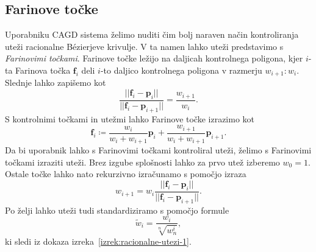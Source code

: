 \documentclass[isrm2, tisk]{fmfdelo}
\newcommand{\p}{\mathbf{p}}
\begin{document}
    \subsection{Farinove točke}
    Uporabniku CAGD sistema želimo nuditi čim bolj naraven način kontroliranja uteži racionalne Bézierjeve krivulje.
    V ta namen lahko uteži predstavimo s \textit{Farinovimi točkami}.
    Farinove točke ležijo na daljicah kontrolnega poligona, kjer $i$-ta Farinova točka $\mathbf{f}_i$ deli $i$-to daljico kontrolnega poligona v razmerju $w_{i+1}:w_{i}$.
    Slednje lahko zapišemo kot \[\frac{||\mathbf{f}_i-\p_i||}{||\mathbf{f}_i-\p_{i+1}||} = \frac{w_{i+1}}{w_{i}}.\]
    S kontrolnimi točkami in utežmi lahko Farinove točke izrazimo kot
    \[\mathbf{f}_i \coloneqq \frac{w_{i}}{w_{i}+w_{i+1}}\p_i +  \frac{w_{i+1}}{w_{i}+w_{i+1}}\p_{i+1}.\]
    Da bi uporabnik lahko s Farinovimi točkami kontroliral uteži, želimo s Farinovimi točkami izraziti uteži.
    Brez izgube splošnosti lahko za prvo utež izberemo $w_0=1$.
    Ostale točke lahko nato rekurzivno izračunamo s pomočjo izraza
    \[w_{i+1} = w_i\frac{||\mathbf{f}_i-\p_i||}{||\mathbf{f}_i-\p_{i+1}||}.\]
    Po želji lahko uteži tudi standardiziramo s pomočjo formule \[\tilde{w}_{i} = \frac{w_i}{\sqrt[n]{w_n^i}},\]
    ki sledi iz dokaza izreka~\ref{izrek:racionalne-utezi-1}.
\end{document}
